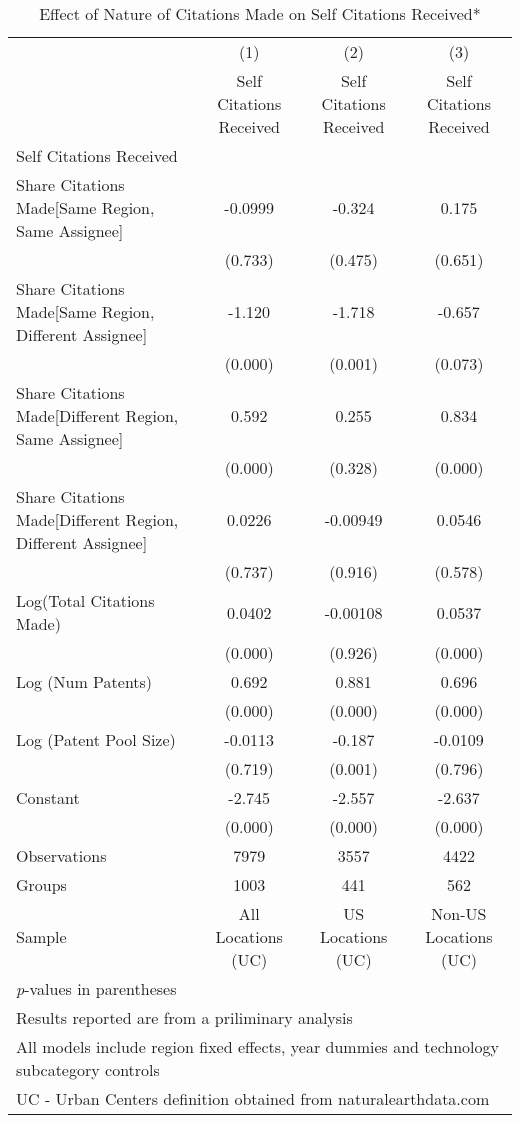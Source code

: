 {
\begin{longtable}{l*{3}{c}}
\caption{Effect of Nature of Citations Made on Self Citations Received*  \label{model131415}}\\
\hline\hline\endfirsthead\hline\endhead\hline\endfoot\endlastfoot
                &\multicolumn{1}{c}{(1)}&\multicolumn{1}{c}{(2)}&\multicolumn{1}{c}{(3)}\\
                &\multicolumn{1}{c}{Self Citations Received}&\multicolumn{1}{c}{Self Citations Received}&\multicolumn{1}{c}{Self Citations Received}\\
\hline
Self Citations Received&         &         &         \\
Share Citations Made[Same Region, Same Assignee]&  -0.0999&   -0.324&    0.175\\
                &  (0.733)&  (0.475)&  (0.651)\\
Share Citations Made[Same Region, Different Assignee]&   -1.120&   -1.718&   -0.657\\
                &  (0.000)&  (0.001)&  (0.073)\\
Share Citations Made[Different Region, Same Assignee]&    0.592&    0.255&    0.834\\
                &  (0.000)&  (0.328)&  (0.000)\\
Share Citations Made[Different Region, Different Assignee]&   0.0226& -0.00949&   0.0546\\
                &  (0.737)&  (0.916)&  (0.578)\\
Log(Total Citations Made)&   0.0402& -0.00108&   0.0537\\
                &  (0.000)&  (0.926)&  (0.000)\\
Log (Num Patents)&    0.692&    0.881&    0.696\\
                &  (0.000)&  (0.000)&  (0.000)\\
Log (Patent Pool Size)&  -0.0113&   -0.187&  -0.0109\\
                &  (0.719)&  (0.001)&  (0.796)\\
Constant        &   -2.745&   -2.557&   -2.637\\
                &  (0.000)&  (0.000)&  (0.000)\\
\hline
Observations    &     7979&     3557&     4422\\
Groups          &     1003&      441&      562\\
Sample          &All Locations (UC)&US Locations (UC)&Non-US Locations (UC)\\
\hline\hline
\multicolumn{4}{l}{\footnotesize \textit{p}-values in parentheses}\\
\multicolumn{4}{l}{\footnotesize * Results reported are from a priliminary analysis}\\
\multicolumn{4}{l}{\footnotesize All models include region fixed effects, year dummies and technology subcategory controls}\\
\multicolumn{4}{l}{\footnotesize UC - Urban Centers definition obtained from naturalearthdata.com}\\
\end{longtable}
}

